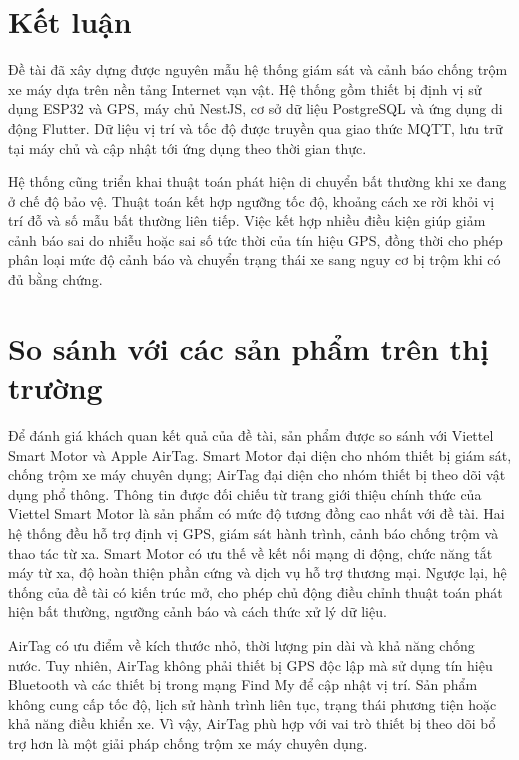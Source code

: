 \documentclass[../DoAn.tex]{subfiles}
\begin{document}
\section{Kết luận}

Đề tài đã xây dựng được nguyên mẫu hệ thống giám sát và cảnh báo chống trộm
xe máy dựa trên nền tảng Internet vạn vật. Hệ thống gồm thiết bị định vị sử
dụng ESP32 và GPS, máy chủ NestJS, cơ sở dữ liệu PostgreSQL và ứng dụng di
động Flutter. Dữ liệu vị trí và tốc độ được truyền qua giao thức MQTT, lưu
trữ tại máy chủ và cập nhật tới ứng dụng theo thời gian thực.

Hệ thống cũng triển khai thuật toán phát hiện di chuyển bất thường khi xe
đang ở chế độ bảo vệ. Thuật toán kết hợp ngưỡng tốc độ, khoảng cách xe rời
khỏi vị trí đỗ và số mẫu bất thường liên tiếp. Việc kết hợp nhiều điều kiện
giúp giảm cảnh báo sai do nhiễu hoặc sai số tức thời của tín hiệu GPS, đồng
thời cho phép phân loại mức độ cảnh báo và chuyển trạng thái xe sang nguy cơ
bị trộm khi có đủ bằng chứng.

\section{So sánh với các sản phẩm trên thị trường}

Để đánh giá khách quan kết quả của đề tài, sản phẩm được so sánh với Viettel
Smart Motor và Apple AirTag. Smart Motor đại diện cho nhóm thiết bị giám sát,
chống trộm xe máy chuyên dụng; AirTag đại diện cho nhóm thiết bị theo dõi vật
dụng phổ thông. Thông tin được đối chiếu từ trang giới thiệu chính thức của Viettel Smart Motor là sản phẩm có mức độ tương đồng cao nhất với đề tài.
Hai hệ thống đều hỗ trợ định vị GPS, giám sát hành trình, cảnh báo chống trộm
và thao tác từ xa. Smart Motor có ưu thế về kết nối mạng di động, chức năng
tắt máy từ xa, độ hoàn thiện phần cứng và dịch vụ hỗ trợ thương mại. Ngược
lại, hệ thống của đề tài có kiến trúc mở, cho phép chủ động điều chỉnh thuật
toán phát hiện bất thường, ngưỡng cảnh báo và cách thức xử lý dữ liệu.

AirTag có ưu điểm về kích thước nhỏ, thời lượng pin dài và khả năng chống
nước. Tuy nhiên, AirTag không phải thiết bị GPS độc lập mà sử dụng tín hiệu
Bluetooth và các thiết bị trong mạng Find My để cập nhật vị trí. Sản phẩm
không cung cấp tốc độ, lịch sử hành trình liên tục, trạng thái phương tiện
hoặc khả năng điều khiển xe. Vì vậy, AirTag phù hợp với vai trò thiết bị theo
dõi bổ trợ hơn là một giải pháp chống trộm xe máy chuyên dụng.
\end{document}
